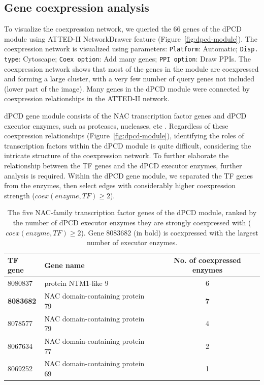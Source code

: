 \subsection{Gene coexpression analysis}
\hspace{1em}To visualize the coexpression network, we queried the 66 genes of the dPCD module using ATTED-II NetworkDrawer feature (Figure~\ref{fig:dpcd-module}). The coexpression network is visualized using parameters: \texttt{Platform}: Automatic; \texttt{Disp. type}: Cytoscape; \texttt{Coex option}: Add many genes; \texttt{PPI option}: Draw PPIs. The coexpression network shows that most of the genes in the module are coexpressed and forming a large cluster, with a very few number of query genes not included (lower part of the image). Many genes in the dPCD module were connected by coexpression relationships in the ATTED-II network.

\hspace{1em}dPCD gene module consists of the NAC transcription factor genes and dPCD executor enzymes, such as proteases, nucleases, etc \cite{olvera-carrilloConservedCorePCD2015}. Regardless of these coexpression relationships (Figure~\ref{fig:dpcd-module}), identifying the roles of transcription factors within the dPCD module is quite difficult, considering the intricate structure of the coexpression network. To further elaborate the relationship between the TF genes and the dPCD executor enzymes, further analysis is required. Within the dPCD gene module, we separated the TF genes from the enzymes, then select edges with considerably higher coexpression strength ($coex(enzyme, TF) \geq 2$).

\begin{table}[H]
    \centering
    \begin{tabularx}{\columnwidth}{l X c}
        \toprule
        TF gene & Gene name & No. of coexpressed enzymes \\
        \midrule
        8080837 & protein NTM1-like 9 & 6 \\
        \textbf{8083682} & NAC domain-containing protein 79 & \textbf{7} \\
        8078577 & NAC domain-containing protein 79 & 4 \\
        8067634 & NAC domain-containing protein 77 & 2 \\
        8069252 & NAC domain-containing protein 69 & 1 \\
        \bottomrule
    \end{tabularx}
    \caption{The five NAC-family transcription factor genes of the dPCD module, ranked by the number of dPCD executor enzymes they are strongly coexpressed with ($coex(enzyme, TF) \geq 2$). Gene 8083682 (in bold) is coexpressed with the largest number of executor enzymes.}
    \label{tab:tf-coexpressed-enzymes}
\end{table}

